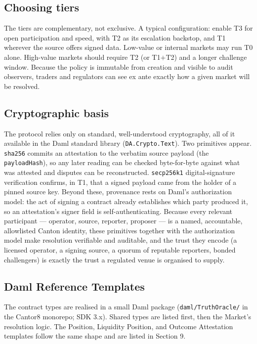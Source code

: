 \documentclass[11pt,a4paper]{article}
\begin{document}
\subsection{Choosing tiers}

The tiers are complementary, not exclusive. A typical configuration: enable T3 for open participation and speed, with T2 as its escalation backstop, and T1 wherever the source offers signed data. Low-value or internal markets may run T0 alone. High-value markets should require T2 (or T1$+$T2) and a longer challenge window. Because the policy is immutable from creation and visible to audit observers, traders and regulators can see ex ante exactly how a given market will be resolved.

\subsection{Cryptographic basis}

\begin{sloppypar}
The protocol relies only on standard, well-understood cryptography, all of it available in the Daml standard library (\texttt{DA.Crypto.Text}). Two primitives appear. \texttt{sha256} commits an attestation to the verbatim source payload (the \texttt{payloadHash}), so any later reading can be checked byte-for-byte against what was attested and disputes can be reconstructed. \texttt{secp256k1} digital-signature verification confirms, in T1, that a signed payload came from the holder of a pinned source key. Beyond these, provenance rests on Daml's authorization model: the act of signing a contract already establishes which party produced it, so an attestation's signer field is self-authenticating. Because every relevant participant --- operator, source, reporter, proposer --- is a named, accountable, allowlisted Canton identity, these primitives together with the authorization model make resolution verifiable and auditable, and the trust they encode (a licensed operator, a signing source, a quorum of reputable reporters, bonded challengers) is exactly the trust a regulated venue is organised to supply.
\end{sloppypar}

\subsection{Daml Reference Templates}

The contract types are realised in a small Daml package (\texttt{daml/TruthOracle/} in the Cantor8 monorepo; SDK 3.x). Shared types are listed first, then the Market's resolution logic. The Position, Liquidity Position, and Outcome Attestation templates follow the same shape and are listed in Section 9.
\end{document}
